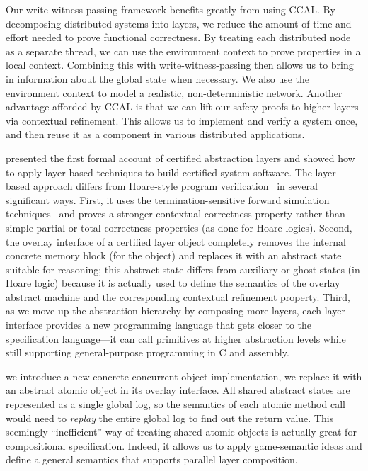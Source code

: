 Our write-witness-passing framework benefits greatly from using CCAL.
By decomposing distributed systems into layers, we reduce the amount of time and effort needed to
prove functional correctness.
By treating each distributed node as a separate thread, we can use the environment context to
prove properties in a local context.
Combining this with write-witness-passing then allows us to bring in information about the global state when necessary.
We also use the environment context to model a realistic, non-deterministic network.
Another advantage afforded by CCAL is that we can lift our safety proofs to higher layers via contextual refinement.
This allows us to implement and verify a system once, and then reuse it as a component in various distributed applications.

presented the first formal account of certified abstraction layers and
showed how to apply layer-based techniques to build certified system
software. The layer-based approach differs from Hoare-style program
verification~\cite{hoare69,reynolds02,boogie05,nanevski06} in several
significant ways. First, it uses the termination-sensitive forward
simulation techniques~\cite{Lynch95,compcert} and proves a stronger
contextual correctness property rather than simple partial or total
correctness properties (as done for Hoare logics).
Second, the overlay interface of a certified layer object completely
removes the internal concrete memory block (for the object) and
replaces it with an abstract state suitable for reasoning; this
abstract state differs from auxiliary or ghost states (in Hoare
logic) because it is actually used to define the semantics of the
overlay abstract machine and the corresponding contextual refinement
property.
Third, as we move up the abstraction hierarchy by composing more
layers, each layer interface provides a new programming language that gets
closer to the specification language---it can call primitives at
higher abstraction levels while still supporting general-purpose
programming in C and assembly.

 we introduce a new concrete concurrent object implementation, we
 replace it with an abstract atomic object in its overlay
 interface. All shared abstract states are represented as a single
 global log, so the semantics of each atomic method call would need to
 {\em replay} the entire global log to find out the return value.  This
 seemingly ``inefficient'' way of treating shared atomic objects is
 actually great for compositional specification. Indeed, it allows us
 to apply game-semantic ideas and define a general semantics that
 supports parallel layer composition.

